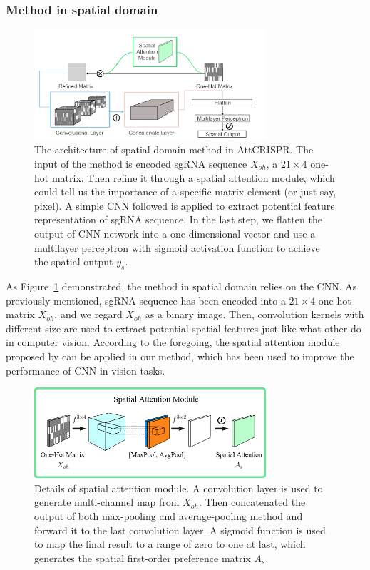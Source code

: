 \documentclass{bioinfo}
\begin{document}
\subsubsection{Method in spatial domain}

\begin{figure}[!tpb]%
    \centerline{\includegraphics[width=86mm]{CNNv2.png}}
    \caption{The architecture of spatial domain method in AttCRISPR. 
    The input of the method is encoded sgRNA sequence $X_{oh}$, a $21\times 4$ one-hot matrix. 
    Then refine it through a spatial attention module, which could tell us the importance of a specific matrix element (or just say, pixel).
    A simple CNN followed is applied to extract potential feature representation of sgRNA sequence.
    In the last step, we flatten the output of CNN network into a one dimensional vector and 
    use a multilayer perceptron with sigmoid activation function to achieve the spatial output $y_s$.}\label{fig:CNN}
\end{figure}
As Figure~\ref{fig:CNN} demonstrated, the method in spatial domain relies on the CNN. 
As previously mentioned, sgRNA sequence has been encoded into a $21\times 4$ one-hot matrix $X_{oh}$, and we regard $X_{oh}$ as a binary image. 
Then, convolution kernels with different size are used to extract potential spatial features just like what other do in computer vision. 
According to the foregoing, the spatial attention module proposed by \citeauthor{woo2018cbam:} can be applied in our method, 
which has been used to improve the performance of CNN in vision tasks.

\begin{figure}[!tpb]%
    \centerline{\includegraphics[width=86mm]{spatialmodule.png}}
    \caption{Details of spatial attention module. A convolution layer is used to generate multi-channel map from $X_{oh}$.
    Then concatenated the output of both max-pooling and average-pooling method and forward it to the last convolution layer.
    A sigmoid function is used to map the final result to a range of zero to one at last, 
    which generates the spatial first-order preference matrix $A_s$.
    }\label{fig:spatialmodule}
\end{figure}
\end{document}

